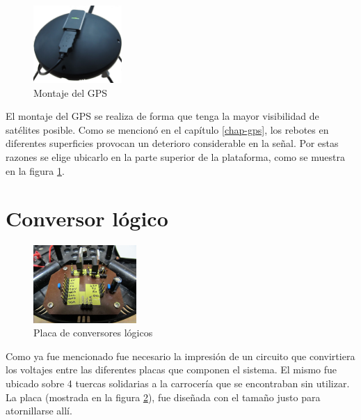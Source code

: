 \documentclass[main]{subfiles}
\begin{document}
\begin{figure}
	\begin{center}
	\vspace{-45pt}
		\includegraphics[width=0.3\textwidth]{./pics_montaje/gps.jpg}
	\end{center}
	\caption{Montaje del GPS}
	\vspace{-10pt}
	\label{fig:montaje_gps}
\end{figure}

El montaje del GPS se realiza de forma que tenga la mayor visibilidad de satélites posible. Como se mencionó en el capítulo \ref{chap-gps}, los rebotes en diferentes superficies provocan un deterioro considerable en la señal. Por estas razones se elige ubicarlo en la parte superior de la plataforma, como se muestra en la figura \ref{fig:montaje_gps}.

\vspace{25pt}

\section{Conversor lógico}

\begin{figure}
	\begin{center}
	\vspace{-40pt}
		\includegraphics[width=0.35\textwidth]{./pics_montaje/cl2.jpg}
	\end{center}
	\caption{Placa de conversores lógicos}
	\vspace{-30pt}
	\label{fig:cl}
\end{figure}

Como ya fue mencionado fue necesario la impresión de un circuito que convirtiera los voltajes entre las diferentes placas que componen el sistema. El mismo fue ubicado sobre 4 tuercas solidarias a la carrocería que se encontraban sin utilizar. La placa (mostrada en la figura \ref{fig:cl}), fue diseñada con el tamaño justo para atornillarse allí.
\end{document}
